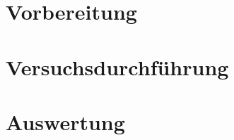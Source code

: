 \documentclass{article}
\begin{document}

\section{Vorbereitung}


%

\section{Versuchsdurchführung}
%

\section{Auswertung}
%

\end{document}
